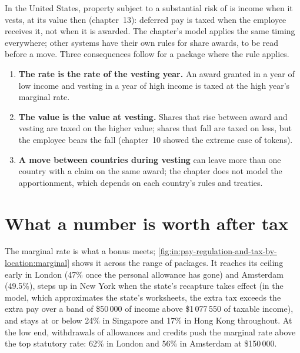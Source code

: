 In the United States, property subject to a substantial risk of  is income when it vests, at its value then
(chapter~13): deferred pay is taxed when the employee receives it, not when it is awarded. The chapter's model applies the
same timing everywhere; other systems have their own rules for share awards, to be read before a move. Three
consequences follow for a package where the rule applies.
\begin{enumerate}
\item \textbf{The rate is the rate of the vesting year.} An award granted in a year of low income and vesting in a year of
high income is taxed at the high year's marginal rate.
\item \textbf{The value is the value at vesting.} Shares that rise between award and vesting are taxed on the higher value;
shares that fall are taxed on less, but the employee bears the fall (chapter~10 showed the extreme case of tokens).
\item \textbf{A move between countries during vesting} can leave more than one country with a claim on the same award;
the chapter does not model the apportionment, which depends on each country's rules and treaties.
\end{enumerate}

\section{What a number is worth after tax}

The marginal rate is what a bonus meets; \cref{fig:in:pay-regulation-and-tax-by-location:marginal} shows it across the
range of packages. It reaches its ceiling early in London (47\% once the personal allowance has gone) and Amsterdam
(49.5\%), steps up in New York when the state's recapture takes effect (in the model, which approximates the state's worksheets,
the extra tax exceeds the extra pay over a band of \$50\,000 of income above \$1\,077\,550 of taxable income), and stays at or below 24\% in Singapore and 17\% in
Hong Kong throughout. At the low end, withdrawals of allowances and credits push the marginal rate above the top
statutory rate: 62\% in London and 56\% in Amsterdam at \$150\,000.

